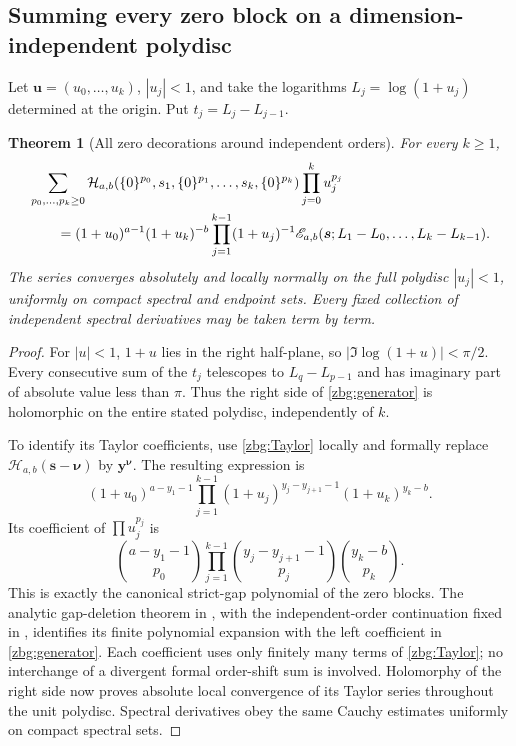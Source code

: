 \documentclass[11pt,letterpaper]{article}
\numberwithin{equation}{section}
\theoremstyle{plain}
\newtheorem{theorem}{Theorem}[section]
\theoremstyle{definition}
\theoremstyle{remark}
\begin{document}
\subsection{Summing every zero block on a dimension-independent polydisc}

Let $\boldsymbol u=(u_0,\ldots,u_k)$, $|u_j|<1$, and take the
logarithms $L_j=\log(1+u_j)$ determined at the origin.  Put
$t_j=L_j-L_{j-1}$.

\begin{theorem}[All zero decorations around independent orders]
\label{zbg:main}
For every $k\geq1$,
\begin{align}\label{zbg:generator}
 &\sum_{p_0,\ldots,p_k\geq0}
 \mathcal H_{a,b}(\{0\}^{p_0},s_1,\{0\}^{p_1},\ldots,
                       s_k,\{0\}^{p_k})\prod_{j=0}^ku_j^{p_j}
 \notag\\
 &\qquad=(1+u_0)^{a-1}(1+u_k)^{-b}
                    \prod_{j=1}^{k-1}(1+u_j)^{-1}
        \mathscr E_{a,b}(\boldsymbol s;
                L_1-L_0,\ldots,L_k-L_{k-1}).
\end{align}
The series converges absolutely and locally normally on the full
polydisc $|u_j|<1$, uniformly on compact spectral and endpoint sets.
Every fixed collection of independent spectral derivatives may be
taken term by term.
\end{theorem}

\begin{proof}
For $|u|<1$, $1+u$ lies in the right half-plane, so
$|\Im\log(1+u)|<\pi/2$.  Every consecutive sum of the $t_j$
telescopes to $L_q-L_{p-1}$ and has imaginary part of absolute value
less than $\pi$.  Thus the right side of \eqref{zbg:generator}
is holomorphic on the entire stated polydisc, independently of $k$.

To identify its Taylor coefficients, use \eqref{zbg:Taylor} locally
and formally replace
$\mathcal H_{a,b}(\boldsymbol s-\boldsymbol\nu)$ by
$\boldsymbol y^{\boldsymbol\nu}$.  The resulting expression is
\[
 (1+u_0)^{a-y_1-1}
 \prod_{j=1}^{k-1}(1+u_j)^{y_j-y_{j+1}-1}
 (1+u_k)^{y_k-b}.
\]
Its coefficient of $\prod u_j^{p_j}$ is
\[
 \binom{a-y_1-1}{p_0}
 \prod_{j=1}^{k-1}\binom{y_j-y_{j+1}-1}{p_j}
 \binom{y_k-b}{p_k}.
\]
This is exactly the canonical strict-gap polynomial of the zero
blocks.  The analytic gap-deletion theorem in \cite{IncomingParity},
with the independent-order continuation fixed in \cite{IncomingIndependent},
identifies its finite polynomial expansion with
the left coefficient in \eqref{zbg:generator}.  Each coefficient
uses only finitely many terms of \eqref{zbg:Taylor}; no interchange
of a divergent formal order-shift sum is involved.  Holomorphy of the
right side now proves absolute local convergence of its Taylor series
throughout the unit polydisc.  Spectral derivatives obey the same
Cauchy estimates uniformly on compact spectral sets.
\end{proof}
\end{document}
